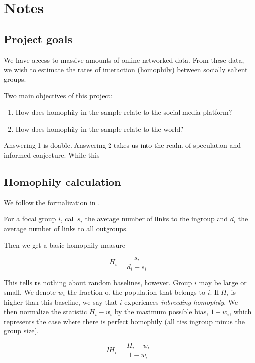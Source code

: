 \documentclass[a4paper]{article}
\begin{document}
\section{Notes}

\subsection{Project goals}

We have access to massive amounts of online networked data. From these data, we wish to estimate the rates of interaction (homophily) between socially salient groups.

Two main objectives of this project:

\begin{enumerate}
\item How does homophily in the sample relate to the social media platform?
\item How does homophily in the sample relate to the world?
\end{enumerate}

Answering 1 is doable. Answering 2 takes us into the realm of speculation and informed conjecture. While this

\subsection{Homophily calculation}

We follow the formalization in \cite{currarini_economic_2009}.

For a focal group $i$, call $s_i$ the average number of links to the ingroup and $d_i$ the average number of links to all outgroups.

Then we get a basic homophily measure

\begin{equation}
H_i = \frac{s_i}{d_i + s_i}
\end{equation}

This tells us nothing about random baselines, however. Group $i$ may be large or small. We denote $w_i$ the fraction of the population that belongs to $i$. If $H_i$ is higher than this baseline, we say that $i$ experiences \emph{inbreeding homophily}. We then normalize the statistic $H_i - w_i$ by the maximum possible bias, $1 - w_i$, which represents the case where there is perfect homophily (all ties ingroup minus the group size).

\begin{equation}
IH_i = \frac{H_i - w_i}{1 - w_i}
\end{equation}
\end{document}
